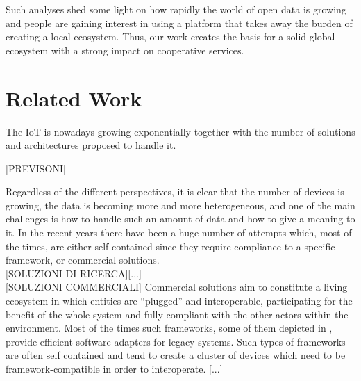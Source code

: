 \documentclass[conference]{IEEEtran}
\begin{document}
Such analyses shed some light on how rapidly the world of open data is growing and people are gaining interest in using a platform that takes away the burden of creating a local ecosystem.
Thus, our work creates the basis for a solid global ecosystem with a strong impact on cooperative services.

\section{Related Work}

The IoT is nowadays growing exponentially together with the number of solutions and architectures proposed to handle it.

[PREVISONI]
 
Regardless of the different perspectives, it is clear that the number of devices is growing, the data is becoming more and more heterogeneous, and one of the main challenges is how to handle such an amount of data and how to give a meaning to it.
In the recent years there have been a huge number of attempts which, most of the times, are either self-contained since they require compliance to a specific framework, or commercial solutions.
\\

[SOLUZIONI DI RICERCA][...]
\\

[SOLUZIONI COMMERCIALI]
Commercial solutions aim to constitute a living ecosystem in which entities are ``plugged'' and interoperable, participating for the benefit of the whole system and fully compliant with the other actors within the environment.
Most of the times such frameworks, some of them depicted in \cite{derhamy2015survey}, provide efficient software adapters for legacy systems.
Such types of frameworks are often self contained and tend to create a cluster of devices which need to be framework-compatible in order to interoperate.
[...]
\end{document}
